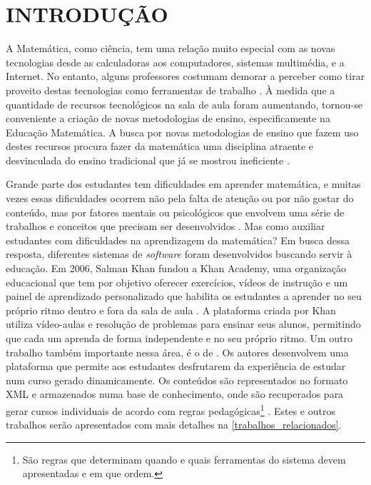 \section{INTRODUÇÃO}

A Matemática, como ciência, tem uma relação muito especial com as novas tecnologias desde as calculadoras aos computadores, sistemas multimédia, e a Internet. No entanto, alguns professores costumam demorar a perceber como tirar proveito destas tecnologias como ferramentas de trabalho \cite{da1997ensino}. \`A medida que a quantidade de recursos tecnológicos na sala de aula foram aumentando, tornou-se conveniente a criação de novas metodologias de ensino, especificamente na Educação Matemática. A 
busca por novas metodologias de ensino que fazem uso destes recursos procura fazer da matemática uma disciplina atraente e desvinculada do ensino tradicional que já se mostrou ineficiente 
\cite{silva2009ambiente}.

Grande parte dos estudantes tem dificuldades em aprender matemática, e muitas vezes essas dificuldades ocorrem não pela falta de atenção ou por não gostar do conteúdo, mas por fatores mentais ou psicológicos que envolvem uma série de trabalhos e conceitos que precisam ser desenvolvidos \cite{sa2015software}. Mas como auxiliar estudantes com dificuldades na aprendizagem da matemática? Em busca dessa resposta, diferentes sistemas de \textit{software} foram desenvolvidos buscando servir \`a  educação. Em 2006, Salman Khan fundou a Khan Academy, uma organização educacional que tem 
por objetivo oferecer exercícios, vídeos de instrução e um painel de aprendizado personalizado que habilita os estudantes a aprender no seu próprio ritmo dentro e fora da sala de aula 
\cite{khan2012one}. A plataforma criada por Khan utiliza vídeo-aulas e resolução de problemas para ensinar seus alunos, permitindo que cada um aprenda de forma independente e no seu pr\'oprio ritmo. Um outro trabalho também  importante nessa área, \'e o de  . Os autores desenvolvem uma plataforma que permite aos estudantes desfrutarem da experiência de estudar num curso gerado dinamicamente. Os conte\'udos s\~ao representados no formato XML \cite{bray1998extensible} e armazenados numa base de conhecimento, onde s\~ao recuperados para gerar cursos individuais de acordo com regras pedagógicas\footnote{S\~ao regras que determinam quando e quais ferramentas do sistema devem apresentadas e em que ordem.} \cite{melis2004activemath}. Estes e outros trabalhos serão 
apresentados com mais detalhes na \autoref{trabalhos_relacionados}.

